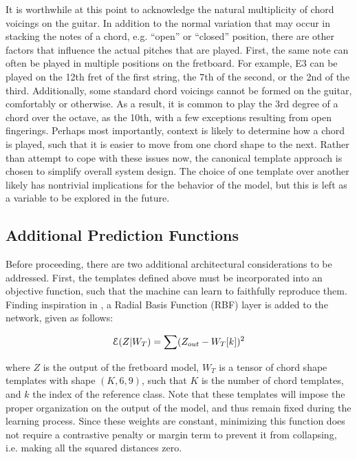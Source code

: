 It is worthwhile at this point to acknowledge the natural multiplicity of chord voicings on the guitar.
In addition to the normal variation that may occur in stacking the notes of a chord, e.g. ``open'' or ``closed'' position, there are other factors that influence the actual pitches that are played.
First, the same note can often be played in multiple positions on the fretboard.
For example, E3 can be played on the 12th fret of the first string, the 7th of the second, or the 2nd of the third.
Additionally, some standard chord voicings cannot be formed on the guitar, comfortably or otherwise.
As a result, it is common to play the 3rd degree of a chord over the octave, as the 10th, with a few exceptions resulting from open fingerings.
Perhaps most importantly, context is likely to determine how a chord is played, such that it is easier to move from one chord shape to the next.
Rather than attempt to cope with these issues now, the canonical template approach is chosen to simplify overall system design.
The choice of one template over another likely has nontrivial implications for the behavior of the model, but this is left as a variable to be explored in the future.


\subsection{Additional Prediction Functions}
\label{subsec:loss}

Before proceeding, there are two additional architectural considerations to be addressed.
First, the templates defined above must be incorporated into an objective function, such that the machine can learn to faithfully reproduce them.
Finding inspiration in \cite{LeCun1998}, a Radial Basis Function (RBF) layer is added to the network, given as follows:

\begin{equation}
\small
\mathcal{E}(Z \vert W_T) = \sum(Z_{out} - W_{T}[k])^2
\end{equation}

\noindent where $Z$ is the output of the fretboard model, $W_T$ is a tensor of chord shape templates with shape $(K, 6, 9)$, such that $K$ is the number of chord templates, and $k$ the index of the reference class.
Note that these templates will impose the proper organization on the output of the model, and thus remain fixed during the learning process.
Since these weights are constant, minimizing this function does not require a contrastive penalty or margin term to prevent it from collapsing, i.e. making all the squared distances zero.

